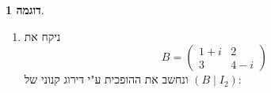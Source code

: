 \documentclass[12pt]{report}
\theoremstyle{plain}
\theoremstyle{definition}
\newtheorem{example}{דוגמה}[chapter]
\newcommand{\0}{\mathbf{0}}
\begin{document}
\begin{example}
\begin{enumerate}[label=\alph*.]
\begin{align*}
&\xrightarrow{R_1-5R_3\to R_1}
\left(
\begin{array}{ccc|ccc}
1 & 0 & 0 & \tfrac13 & -\tfrac53 & \tfrac13\\
0 & 1 & -2 & 2 & 0 & -1\\
0 & 0 & 1 & -\tfrac23 & \tfrac13 & \tfrac13
\end{array}
\right)
\\[4pt]
&\xrightarrow{R_2+2R_3\to R_2}
\left(
\begin{array}{ccc|ccc}
1 & 0 & 0 & \tfrac13 & -\tfrac53 & \tfrac13\\
0 & 1 & 0 & \tfrac23 & \tfrac23 & -\tfrac13\\
0 & 0 & 1 & -\tfrac23 & \tfrac13 & \tfrac13
\end{array}
\right)
\end{align*}

אז קיבלנו
$$
.A^{-1}=
\begin{pmatrix}
\frac{1}{3} & -\frac{5}{3} & \frac{1}{3}\\
\frac{2}{3} & \frac{2}{3} & -\frac{1}{3}\\
-\frac{2}{3} & \frac{1}{3} & \frac{1}{3}
\end{pmatrix}
$$


\item 
ניקח את
$$
B=\begin{pmatrix}
1+i & 2 \\
3 & 4-i
\end{pmatrix}
$$
ונחשב את ההופכית ע"י דירוג קנוני של 
$(B \mid I_2)$:


\end{enumerate}
\end{example}
\end{document}
